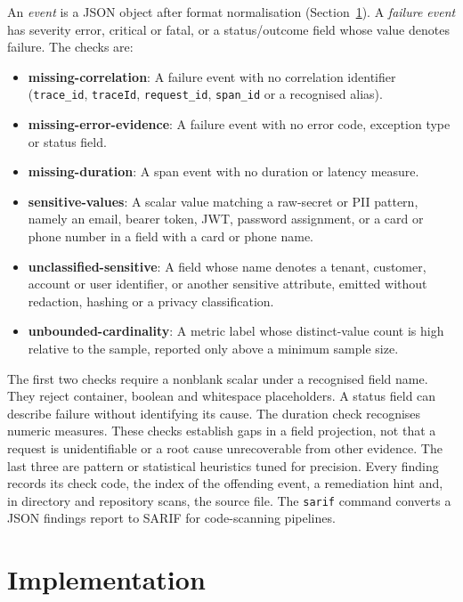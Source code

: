 \documentclass[conference]{IEEEtran}
\begin{document}
An \emph{event} is a JSON object after format normalisation (Section~\ref{sec:impl}). A \emph{failure event} has severity error, critical or fatal, or a status/outcome field whose value denotes failure. The checks are:

\begin{itemize}
\item \textbf{missing-correlation}: A failure event with no correlation identifier (\texttt{trace\_id}, \texttt{traceId}, \texttt{request\_id}, \texttt{span\_id} or a recognised alias).
\item \textbf{missing-error-evidence}: A failure event with no error code, exception type or status field.
\item \textbf{missing-duration}: A span event with no duration or latency measure.
\item \textbf{sensitive-values}: A scalar value matching a raw-secret or PII pattern, namely an email, bearer token, JWT, password assignment, or a card or phone number in a field with a card or phone name.
\item \textbf{unclassified-sensitive}: A field whose name denotes a tenant, customer, account or user identifier, or another sensitive attribute, emitted without redaction, hashing or a privacy classification.
\item \textbf{unbounded-cardinality}: A metric label whose distinct-value count is high relative to the sample, reported only above a minimum sample size.
\end{itemize}

The first two checks require a nonblank scalar under a recognised field name. They reject container, boolean and whitespace placeholders. A status field can describe failure without identifying its cause. The duration check recognises numeric measures. These checks establish gaps in a field projection, not that a request is unidentifiable or a root cause unrecoverable from other evidence. The last three are pattern or statistical heuristics tuned for precision. Every finding records its check code, the index of the offending event, a remediation hint and, in directory and repository scans, the source file. The \texttt{sarif} command converts a JSON findings report to SARIF for code-scanning pipelines.

\section{Implementation}\label{sec:impl}
\end{document}
